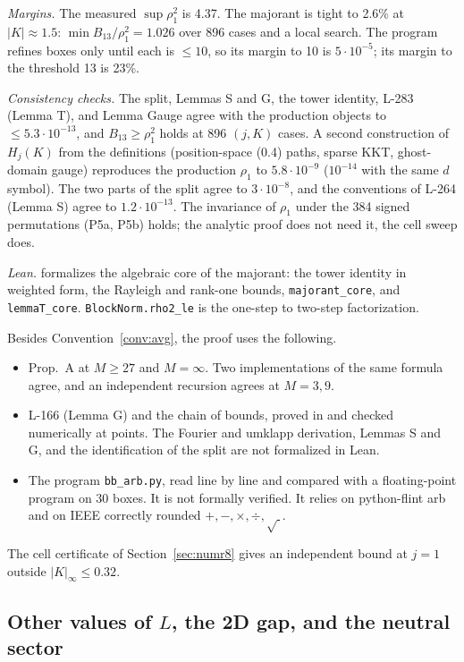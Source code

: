 \emph{Margins.} The measured $\sup\rho_1^2$ is 4.37. The majorant is tight to 2.6\% at $|K|\approx1.5$: $\min B_{13}/\rho_1^2=1.026$ over 896 cases and a local search. The program refines boxes only until each is $\le10$, so its margin to 10 is $5\cdot10^{-5}$; its margin to the threshold 13 is 23\%.

\emph{Consistency checks.} The split, Lemmas S and G, the tower identity, L-283 (Lemma T), and Lemma Gauge agree with the production objects to $\le5.3\cdot10^{-13}$, and $B_{13}\ge\rho_1^2$ holds at 896 $(j,K)$ cases. A second construction of $H_j(K)$ from the definitions (position-space (0.4) paths, sparse KKT, ghost-domain gauge) reproduces the production $\rho_1$ to $5.8\cdot10^{-9}$ ($10^{-14}$ with the same $d$ symbol). The two parts of the split agree to $3\cdot10^{-8}$, and the conventions of L-264 (Lemma S) agree to $1.2\cdot10^{-13}$. The invariance of $\rho_1$ under the 384 signed permutations (P5a, P5b) holds; the analytic proof does not need it, the cell sweep does.

\emph{Lean.}  formalizes the algebraic core of the majorant: the tower identity in weighted form, the Rayleigh and rank-one bounds, \texttt{majorant\_core}, and \texttt{lemmaT\_core}. \texttt{BlockNorm.rho2\_le} is the one-step to two-step factorization.

\begin{remark}
Besides Convention~\ref{conv:avg}, the proof uses the following.
\begin{itemize}
\item Prop.\ A at $M\ge27$ and $M=\infty$. Two implementations of the same formula agree, and an independent recursion agrees at $M=3,9$.
\item L-166 (Lemma G) and the chain of bounds, proved in  and checked numerically at points. The Fourier and umklapp derivation, Lemmas S and G, and the identification of the split are not formalized in Lean.
\item The program \texttt{bb\_arb.py}, read line by line and compared with a floating-point program on 30 boxes. It is not formally verified. It relies on python-flint arb and on IEEE correctly rounded $+,-,\times,\div,\sqrt{\ }$.
\end{itemize}
The cell certificate of Section~\ref{sec:numr8} gives an independent bound at $j=1$ outside $|K|_\infty\le0.32$.
\end{remark}

\subsection{Other values of $L$, the 2D gap, and the neutral sector}\label{sec:numr7}

